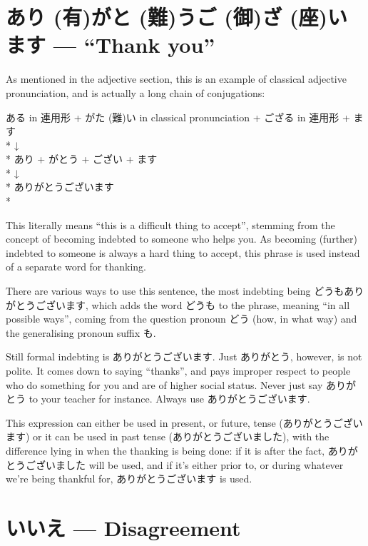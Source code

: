 \documentclass[11pt, b5paper, twoside, openright, onecolumn]{book}
\makeatletter
\newcommand*{\rubystack}[2]{{\relscale{0.5}%
  \begin{tabular}[b]{@{}c@{}}%
    {#1}\\%
   {\textscale{2}{#2}}%
  \end{tabular}}%
}
\DeclareRobustCommand*{\ruby}[2]{%
  \mbox{%
    \setlength{\parskip}{0ex}%
    \BeginAccSupp{method=pdfstringdef,ActualText={#1}}%
      \rubystack{\phantom{#2}}{#1}%
      \llap{%
        \rubystack{#2}{\phantom{#1}}%
      }%
    \EndAccSupp{}%
  }%
}
\renewcommand*{\ruby}[2]{#2 (#1)}%
\newenvironment{exampleblock}{
\setlength{\parindent}{0.6in}
\begin{minipage}[t]{\dimexpr\textwidth-\parindent}}
{\end{minipage}}
\makeatother
\begin{document}
\section*{\ruby{有}{あり}\ruby{難}{がと}う\ruby{御}{ご}\ruby{座}{ざ}います — “Thank you”}

As mentioned in the adjective section‚ this is an example of classical adjective pronunciation‚ and is actually a long chain of conjugations:

\vspace{0.4cm}
\begin{exampleblock}
ある in 連用形 + \ruby{難}{がた}い in classical pronunciation + ござる in 連用形 + ます \\* 
↓ \\* 
あり + がとう + ござい + ます \\* 
↓ \\* 
ありがとうございます \\* 
\end{exampleblock}
\vspace{0.2cm}

This literally means “this is a difficult thing to accept”‚ stemming from the concept of becoming indebted to someone who helps you. As becoming (further) indebted to someone is always a hard thing to accept‚ this phrase is used instead of a separate word for thanking.

There are various ways to use this sentence‚ the most indebting being どうもありがとうございます‚ which adds the word どうも to the phrase‚ meaning “in all possible ways”‚ coming from the question pronoun どう (how‚ in what way) and the generalising pronoun suffix も.

Still formal indebting is ありがとうございます. Just ありがとう‚ however‚ is not polite. It comes down to saying “thanks”‚ and pays improper respect to people who do something for you and are of higher social status. Never just say ありがとう to your teacher for instance. Always use ありがとうございます.

This expression can either be used in present‚ or future‚ tense (ありがとうございます) or it can be used in past tense (ありがとうございました)‚ with the difference lying in when the thanking is being done: if it is after the fact‚ ありがとうございました will be used‚ and if it’s either prior to‚ or during whatever we’re being thankful for‚ ありがとうございます is used.

\section*{いいえ — Disagreement}
\end{document}
